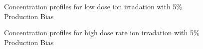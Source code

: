 \documentclass[a4paper]{article}
\begin{document}
\begin{figure}[h!]
        \caption{Concentration profiles for low dose ion irradation with 5\% Production Bias}
        \label{figure:concentrations_ion_5_1e-6}
      \end{figure}
      \begin{figure}[h!]  %
        \centering
        \qquad
        \caption{Concentration profiles for high dose rate ion irradation with 5\% Production Bias}
        \label{figure:concentrations_ion_5_1e-3}
      \end{figure}
\end{document}
